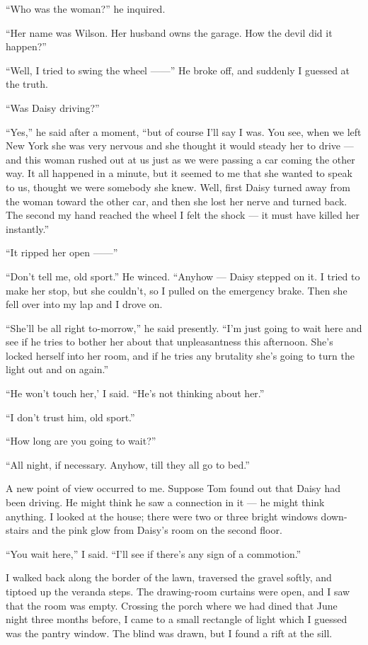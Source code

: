 \documentclass{znotebook}
\begin{document}
``Who was the woman?'' he inquired.

``Her name was Wilson. Her husband owns the garage. How the devil did it happen?''

``Well, I tried to swing the wheel ——'' He broke off, and suddenly I guessed at the truth.

``Was Daisy driving?''

``Yes,'' he said after a moment, ``but of course I'll say I was. You see, when we left New York she was very nervous and she thought it would steady her to drive — and this woman rushed out at us just as we were passing a car coming the other way. It all happened in a minute, but it seemed to me that she wanted to speak to us, thought we were somebody she knew. Well, first Daisy turned away from the woman toward the other car, and then she lost her nerve and turned back. The second my hand reached the wheel I felt the shock — it must have killed her instantly.''

``It ripped her open ——''

``Don't tell me, old sport.'' He winced. ``Anyhow — Daisy stepped on it. I tried to make her stop, but she couldn't, so I pulled on the emergency brake. Then she fell over into my lap and I drove on.

``She'll be all right to-morrow,'' he said presently. ``I'm just going to wait here and see if he tries to bother her about that unpleasantness this afternoon. She's locked herself into her room, and if he tries any brutality she's going to turn the light out and on again.''

``He won't touch her,' I said. ``He's not thinking about her.''

``I don't trust him, old sport.''

``How long are you going to wait?''

``All night, if necessary. Anyhow, till they all go to bed.''

A new point of view occurred to me. Suppose Tom found out that Daisy had been driving. He might think he saw a connection in it — he might think anything. I looked at the house; there were two or three bright windows down-stairs and the pink glow from Daisy's room on the second floor.

``You wait here,'' I said. ``I'll see if there's any sign of a commotion.''

I walked back along the border of the lawn, traversed the gravel softly, and tiptoed up the veranda steps. The drawing-room curtains were open, and I saw that the room was empty. Crossing the porch where we had dined that June night three months before, I came to a small rectangle of light which I guessed was the pantry window. The blind was drawn, but I found a rift at the sill.
\end{document}
